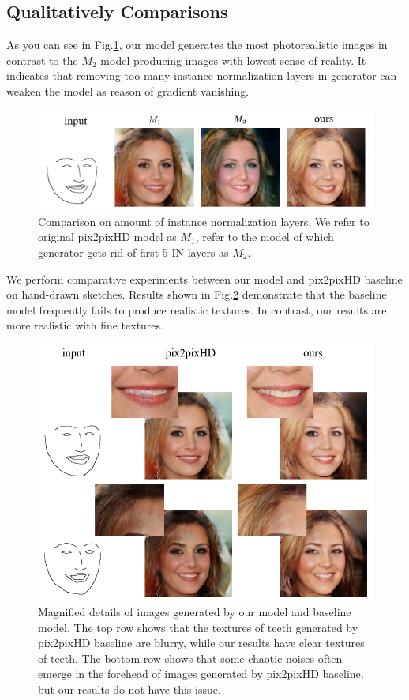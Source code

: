 \documentclass[10pt,twocolumn,letterpaper]{article}
\begin{document}
\subsection{Qualitatively Comparisons}\label{sec:results}
As you can see in Fig.\ref{fig:ablation}, our model generates the most photorealistic images in contrast to the $M_2$ model producing images with lowest sense of reality. It indicates that removing too many instance normalization layers in generator can weaken the model as reason of gradient vanishing.
\begin{figure}[htb]
	\centering
	\includegraphics[width=0.5 \textwidth]{ablation.png}
	\caption{Comparison on amount of instance normalization layers. We refer to original pix2pixHD model as $M_1$, refer to the model of which generator gets rid of first 5 IN layers as $M_2$.}
	\label{fig:ablation}
\end{figure}  

We perform comparative experiments between our model and pix2pixHD baseline on hand-drawn sketches.
Results shown in Fig.\ref{fig:compare_1} demonstrate that the baseline model frequently fails to produce realistic textures. In contrast, our results are more realistic with fine textures.  
\begin{figure}[htb]
	\centering
	\includegraphics[width=0.45 \textwidth]{texture.png}
	\caption{Magnified details of images generated by our model and baseline model. The top row shows that the textures of teeth generated by pix2pixHD baseline are blurry, while our results have clear textures of teeth. The bottom row shows that some chaotic noises often emerge in the forehead of images generated by pix2pixHD baseline, but our results do not have this issue.}
	\label{fig:compare_1}
\end{figure}
\end{document}
